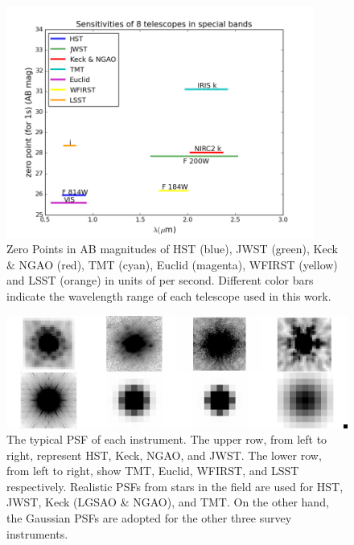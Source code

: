 \documentclass[a4paper,11pt]{article}
\begin{document}
\begin{figure}
\begin{center}
\includegraphics[width=0.9\textwidth]{figures/wavelength_zp.png}
\end{center}
\caption{Zero Points in AB magnitudes of HST (blue), JWST (green), Keck $\&$ NGAO (red), TMT (cyan), Euclid (magenta), WFIRST (yellow) and LSST (orange) in units of per second. Different color bars indicate the wavelength range of each telescope used in this work.}
\label{fig:zp_wavelength}
\end{figure}


\begin{figure}
\begin{center}
\includegraphics[width=1.0\textwidth]{figures/PSF_montage.png}
\end{center}
\caption{The typical PSF of each instrument. The upper row, from left to right, represent HST, Keck, NGAO, and JWST. The lower row, from left to right, show TMT, Euclid, WFIRST, and LSST respectively. Realistic PSFs from stars in the field are used for HST, JWST, Keck (LGSAO \& NGAO), and TMT. On the other hand, the Gaussian PSFs are adopted for the other three survey instruments.}
\label{fig:PSF_montage}
\end{figure}
\end{document}
